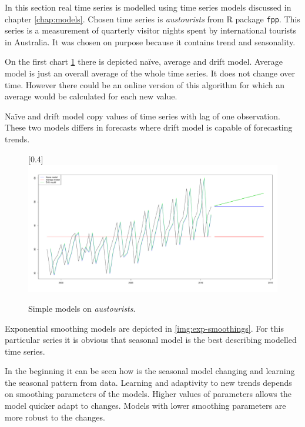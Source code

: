     In this section real time series is modelled using time series models discussed in chapter \ref{chap:models}.
    Chosen time series is \emph{austourists} from R package \texttt{fpp}. This series is a measurement of quarterly
    visitor nights spent by international tourists in Australia. It was chosen on purpose because it contains trend
    and seasonality.

    On the first chart \ref{img:simple-models} there is depicted na\"{i}ve, average and drift model. Average model is
    just an overall average of the whole time series. It does not change over time. However there could be an online
    version of this algorithm for which an average would be calculated for each new value.

    Na\"{i}ve and drift model copy values of time series with lag of one observation. These two models differs in
    forecasts where drift model is capable of forecasting trends.

    \begin{figure}[H]
        \begin{center}
            \scalebox{0.255}[0.4]{\includegraphics{img/simple-models.pdf}}
            \caption{Simple models on \emph{austourists}.}
            \label{img:simple-models}
        \end{center}
    \end{figure}

    Exponential smoothing models are depicted in \ref{img:exp-smoothings}. For this particular series it is obvious that
    seasonal model is the best describing modelled time series.

    In the beginning it can be seen how is the seasonal model changing and learning the seasonal pattern from data.
    Learning and adaptivity to new trends depends on smoothing parameters of the models. Higher values of parameters
    allows the model quicker adapt to changes. Models with lower smoothing parameters are more robust to the changes.

